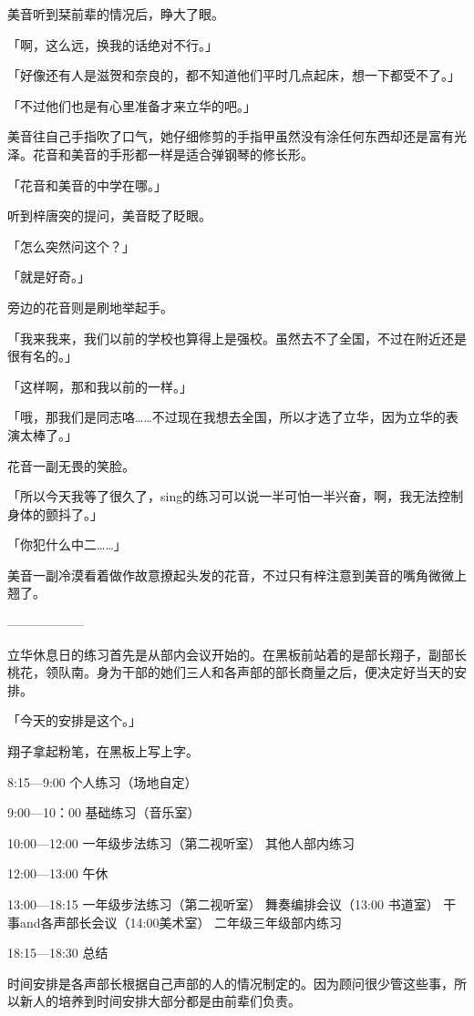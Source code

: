 \documentclass[UTF8]{ctexart}
\begin{document}
    美音听到栞前辈的情况后，睁大了眼。

    「啊，这么远，换我的话绝对不行。」

    「好像还有人是滋贺和奈良的，都不知道他们平时几点起床，想一下都受不了。」

    「不过他们也是有心里准备才来立华的吧。」

    美音往自己手指吹了口气，她仔细修剪的手指甲虽然没有涂任何东西却还是富有光泽。花音和美音的手形都一样是适合弹钢琴的修长形。

    「花音和美音的中学在哪。」

    听到梓唐突的提问，美音眨了眨眼。

    「怎么突然问这个？」

    「就是好奇。」

    旁边的花音则是刷地举起手。

    「我来我来，我们以前的学校也算得上是强校。虽然去不了全国，不过在附近还是很有名的。」

    「这样啊，那和我以前的一样。」

    「哦，那我们是同志咯……不过现在我想去全国，所以才选了立华，因为立华的表演太棒了。」

    花音一副无畏的笑脸。

    「所以今天我等了很久了，sing的练习可以说一半可怕一半兴奋，啊，我无法控制身体的颤抖了。」

    「你犯什么中二……」

    美音一副冷漠看着做作故意撩起头发的花音，不过只有梓注意到美音的嘴角微微上翘了。

    ——————

    立华休息日的练习首先是从部内会议开始的。在黑板前站着的是部长翔子，副部长桃花，领队南。身为干部的她们三人和各声部的部长商量之后，便决定好当天的安排。

    「今天的安排是这个。」

    翔子拿起粉笔，在黑板上写上字。

    8:15—9:00 个人练习（场地自定）

    9:00—10：00 基础练习（音乐室）

    10:00—12:00 一年级步法练习（第二视听室） 其他人部内练习

    12:00—13:00 午休

    13:00—18:15 一年级步法练习（第二视听室） 舞奏编排会议（13:00 书道室） 干事and各声部长会议（14:00美术室） 二年级三年级部内练习

    18:15—18:30 总结

    时间安排是各声部长根据自己声部的人的情况制定的。因为顾问很少管这些事，所以新人的培养到时间安排大部分都是由前辈们负责。
\end{document}
